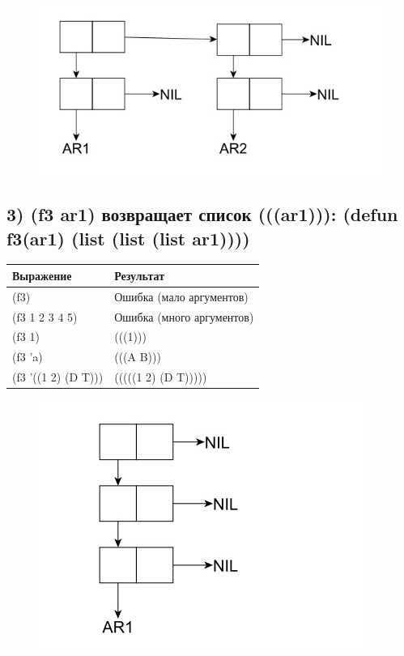 \documentclass[a4paper,12pt]{article}
\begin{document}
	\begin{figure}[h!]
		\begin{center}
			{\includegraphics[scale = 0.4]{second.jpg}}
			\label{second}
		\end{center}
	\end{figure}
	
	\subsection*{ 3) (f3 ar1) возвращает список (((ar1))): (defun f3(ar1) (list (list (list ar1))))}
	
	\begin{table} [h!]
		\begin{center}
			\begin{tabular}{|l|l|}
				\hline
				{\bf  Выражение} &    {\bf Результат} \\
				\hline
				{ (f3)}& Ошибка (мало аргументов)\\
				\hline
				{(f3 1 2 3 4 5)}& Ошибка (много аргументов)\\
				\hline
				{(f3 1)}& (((1)))\\
				\hline
				{(f3 'a)}& (((A B)))\\
				\hline
				{(f3 '((1 2) (D T)))}& (((((1 2) (D T)))))\\
				\hline
			\end{tabular}  
			\label{m5}
		\end{center}
	\end{table}

	\begin{figure}[h!]
		\begin{center}
			{\includegraphics[scale = 0.4]{third.jpg}}
			\label{third}
		\end{center}
	\end{figure}
	
\end{document}
